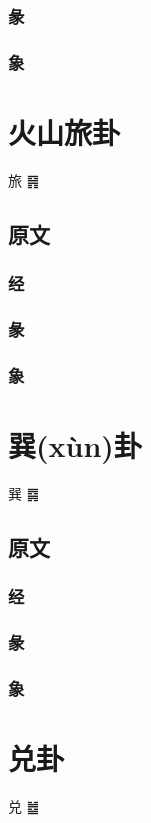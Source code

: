 \documentclass[12pt,oneside]{book}
\begin{document}
\subsection{彖}

\subsection{象}

\chapter{火山旅卦}
旅 {\Large ䷷}
\section{原文}

\subsection{经}

\subsection{彖}

\subsection{象}

\chapter{巽(xùn)卦}
巽 {\Large ䷸}
\section{原文}

\subsection{经}

\subsection{彖}

\subsection{象}


\chapter{兑卦}
兑 {\Large ䷹}
\end{document}
